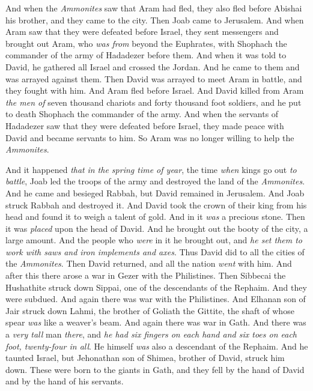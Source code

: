 \begin{biblechapter}
\verse And when the \textit{Ammonites} saw that Aram had fled, they also fled before Abishai his brother, and they came to the city. Then Joab came to Jerusalem.
\verse And when Aram saw that they were defeated before Israel, they sent messengers and brought out Aram, who \textit{was from} beyond the Euphrates, with Shophach the commander of the army of Hadadezer before them.
\verse And when it was told to David, he gathered all Israel and crossed the Jordan. And he came to them and was arrayed against them. Then David was arrayed to meet Aram in battle, and they fought with him.
\verse And Aram fled before Israel. And David killed from Aram \textit{the men of} seven thousand chariots and forty thousand foot soldiers, and he put to death Shophach the commander of the army.
\verse And when the servants of Hadadezer saw that they were defeated before Israel, they made peace with David and became servants to him. So Aram was no longer willing to help the \textit{Ammonites}.
\end{biblechapter}

\begin{biblechapter} %
 And it happened \textit{that} \textit{in the spring time of year}, the time \textit{when} kings go out \textit{to battle}, Joab led the troops of the army and destroyed the land of the \textit{Ammonites}. And he came and besieged Rabbah, but David remained in Jerusalem. And Joab struck Rabbah and destroyed it.
\verse And David took the crown of their king from his head and found it to weigh a talent of gold. And in it \textit{was} a precious stone. Then it was \textit{placed} upon the head of David. And he brought out the booty of the city, a large amount.
\verse And the people who \textit{were} in it he brought out, and \textit{he set them to work with saws and iron implements and axes}. Thus David did to all the cities of the \textit{Ammonites}. Then David returned, and all the nation \textit{went} with him.
 And after this there arose a war in Gezer with the Philistines. Then Sibbecai the Hushathite struck down Sippai, one of the descendants of the Rephaim. And they were subdued.
\verse And again there was war with the Philistines. And Elhanan son of Jair struck down Lahmi, the brother of Goliath the Gittite, the shaft of whose spear \textit{was} like a weaver’s beam.
\verse And again there was war in Gath. And there was a \textit{very tall} man \textit{there}, and \textit{he had six fingers on each hand and six toes on each foot, twenty-four in all}. He himself \textit{was} also a descendant of the Rephaim.
\verse And he taunted Israel, but Jehonathan son of Shimea, brother of David, struck him down.
\verse These were born to the giants in Gath, and they fell by the hand of David and by the hand of his servants.
\end{biblechapter}

